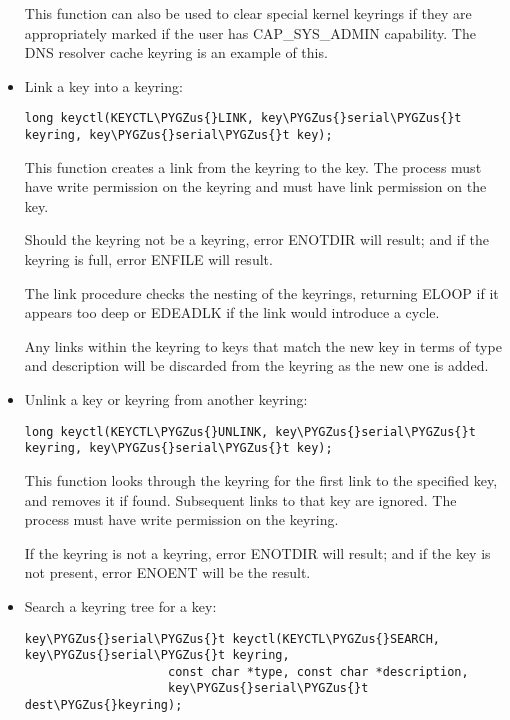 \documentclass[a4paper,8pt,english]{sphinxmanual}
\def\PYGZus{\char`\_}
\begin{document}
\begin{itemize}
This function can also be used to clear special kernel keyrings if they
are appropriately marked if the user has CAP\_SYS\_ADMIN capability.  The
DNS resolver cache keyring is an example of this.

\item {} 
Link a key into a keyring:

\begin{Verbatim}[commandchars=\\\{\}]
long keyctl(KEYCTL\PYGZus{}LINK, key\PYGZus{}serial\PYGZus{}t keyring, key\PYGZus{}serial\PYGZus{}t key);
\end{Verbatim}

This function creates a link from the keyring to the key. The process must
have write permission on the keyring and must have link permission on the
key.

Should the keyring not be a keyring, error ENOTDIR will result; and if the
keyring is full, error ENFILE will result.

The link procedure checks the nesting of the keyrings, returning ELOOP if
it appears too deep or EDEADLK if the link would introduce a cycle.

Any links within the keyring to keys that match the new key in terms of
type and description will be discarded from the keyring as the new one is
added.

\item {} 
Unlink a key or keyring from another keyring:

\begin{Verbatim}[commandchars=\\\{\}]
long keyctl(KEYCTL\PYGZus{}UNLINK, key\PYGZus{}serial\PYGZus{}t keyring, key\PYGZus{}serial\PYGZus{}t key);
\end{Verbatim}

This function looks through the keyring for the first link to the
specified key, and removes it if found. Subsequent links to that key are
ignored. The process must have write permission on the keyring.

If the keyring is not a keyring, error ENOTDIR will result; and if the key
is not present, error ENOENT will be the result.

\item {} 
Search a keyring tree for a key:

\begin{Verbatim}[commandchars=\\\{\}]
key\PYGZus{}serial\PYGZus{}t keyctl(KEYCTL\PYGZus{}SEARCH, key\PYGZus{}serial\PYGZus{}t keyring,
                    const char *type, const char *description,
                    key\PYGZus{}serial\PYGZus{}t dest\PYGZus{}keyring);
\end{Verbatim}


\end{itemize}
\end{document}
